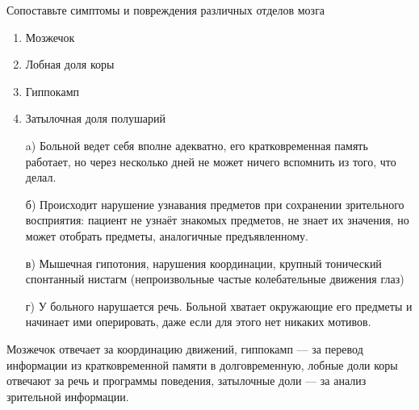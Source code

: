 
Сопоставьте симптомы и повреждения различных отделов мозга

\begin{enumerate}
    \item Мозжечок
    \item Лобная доля коры
    \item Гиппокамп
    \item Затылочная доля полушарий
\end{enumerate}

\begin{enumerate}
    \item[a)] Больной ведет себя вполне адекватно, его кратковременная память работает, но через несколько дней не может ничего вспомнить из того, что делал.
    \item[б)] Происходит нарушение узнавания предметов при сохранении зрительного восприятия: пациент не узнаёт знакомых предметов, не знает их значения, но может отобрать предметы, аналогичные предъявленному.
    \item[в)] Мышечная гипотония, нарушения координации, крупный тонический спонтанный нистагм (непроизвольные частые колебательные движения глаз)
    \item[г)] У больного нарушается речь. Больной хватает окружающие его предметы и начинает ими оперировать, даже если для этого нет никаких мотивов.
\end{enumerate}

\explanationSection

Мозжечок отвечает за координацию движений, гиппокамп — за перевод информации из кратковременной памяти в долговременную, лобные доли коры отвечают за речь и программы поведения, затылочные доли — за анализ зрительной информации.

